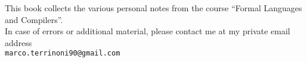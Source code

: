 \documentclass{wileySev}
\newcommand{\code}[1]{\lstinline|#1|}
\begin{document}
    \subtitle{Course notes}





    \titlepage


    \begin{contributors}


    \end{contributors}

    \tableofcontents

    \begin{preface}
        This book collects the various personal notes from the course ``Formal Languages and Compilers''.\\
        In case of errors or additional material, please contact me at my private email address\\
        \code{marco.terrinoni90@gmail.com}

    \end{preface}

    \begin{acronyms}
    \end{acronyms}
\end{document}
